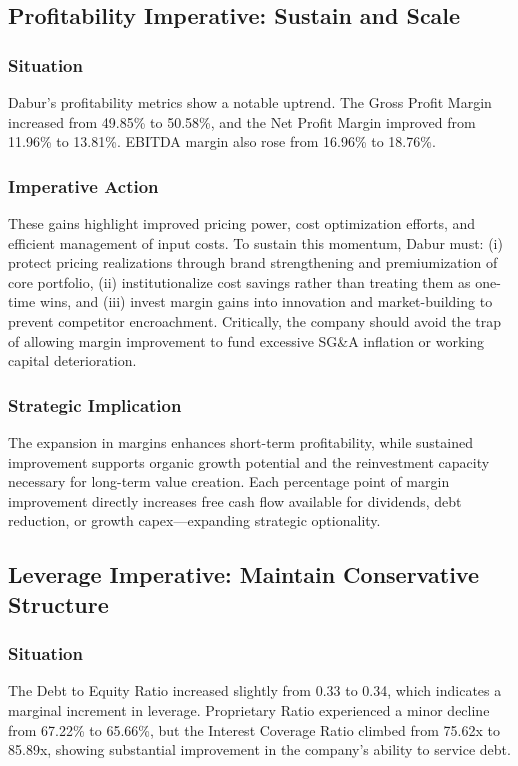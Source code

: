 \documentclass[12pt, a4paper]{report}
\begin{document}
\subsection{Profitability Imperative: Sustain and Scale}

\subsubsection{Situation}
Dabur's profitability metrics show a notable uptrend. The Gross Profit Margin increased from 49.85\% to 50.58\%, and the Net Profit Margin improved from 11.96\% to 13.81\%. EBITDA margin also rose from 16.96\% to 18.76\%.

\subsubsection{Imperative Action}
These gains highlight improved pricing power, cost optimization efforts, and efficient management of input costs. To sustain this momentum, Dabur must: (i) protect pricing realizations through brand strengthening and premiumization of core portfolio, (ii) institutionalize cost savings rather than treating them as one-time wins, and (iii) invest margin gains into innovation and market-building to prevent competitor encroachment. Critically, the company should avoid the trap of allowing margin improvement to fund excessive SG\&A inflation or working capital deterioration.

\subsubsection{Strategic Implication}
The expansion in margins enhances short-term profitability, while sustained improvement supports organic growth potential and the reinvestment capacity necessary for long-term value creation. Each percentage point of margin improvement directly increases free cash flow available for dividends, debt reduction, or growth capex—expanding strategic optionality.

\subsection{Leverage Imperative: Maintain Conservative Structure}

\subsubsection{Situation}
The Debt to Equity Ratio increased slightly from 0.33 to 0.34, which indicates a marginal increment in leverage. Proprietary Ratio experienced a minor decline from 67.22\% to 65.66\%, but the Interest Coverage Ratio climbed from 75.62x to 85.89x, showing substantial improvement in the company's ability to service debt.
\end{document}
